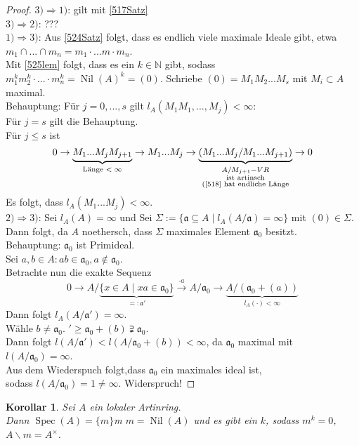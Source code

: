 \documentclass[10pt,a4paper]{article}
\newcommand{\N}{\ensuremath{\mathbb{N}}}
\newcommand{\Spec}{\ensuremath{\operatorname{Spec}}}
\newcommand{\Nil}{\ensuremath{\operatorname{Nil}}}
\newcounter{thm}[section]
\theoremstyle{definition}
\theoremstyle{plain}
\newtheorem{kor}[thm]{Korollar}
\theoremstyle{remark}
\begin{document}
\begin{proof}
	$3)\Rightarrow 1)$: gilt mit \ref{517Satz}\\
	$3)\Rightarrow 2)$: ??? \\%
	$1)\Rightarrow 3)$: Aus \ref{524Satz} folgt, dass es endlich viele maximale Ideale gibt, etwa $m_1\cap...\cap m_n=m_1\cdot...m\cdot m_n$.\\
	Mit \ref{525lem} folgt, dass es ein $k\in\N$ gibt, sodass $m_1^km_2^k\cdot...\cdot m_n^k=\Nil(A)^k=(0)$. Schriebe $(0)=M_1M_2...M_s$ mit $M_i\subset A$ maximal.\\
	Behauptung: Für $j=0,...,s$ gilt $l_A(M_1M_1,...,M_j)<\infty$:\\
	Für $j=s$ gilt die Behauptung.\\
	Für $j\leq s$ ist 
	\[0\rightarrow \underbrace{M_1...M_jM_{j+1}}_{\text{Länge $<\infty$}}
	\rightarrow M_1...M_j
	\rightarrow \underbrace{(M_1...M_j/M_1...M_{j+1})}_{
		\substack{A/M_{j+1}-VR\\
		\text{ist artinsch}\\
		\text{(\ref{518} hat endliche Länge}}}
	\rightarrow 0\]
	Es folgt, dass $l_A(M_1...M_j)<\infty$.\\
	$2)\Rightarrow 3)$: Sei $l_A(A)=\infty$ und Sei $\Sigma:=\{\mathfrak a\subseteq A\mid l_A(A/\mathfrak a)=\infty\}$ mit $(0)\in\Sigma$.\\
	Dann folgt, da $A$ noethersch, dass $\Sigma$ maximales Element $\mathfrak a_0$ besitzt.\\
	Behauptung: $\mathfrak a_0$ ist Primideal.\\
	Sei $a,b\in A:ab\in\mathfrak a_0, a\notin\mathfrak a_0$.\\
	Betrachte nun die exakte Sequenz
	\[0\rightarrow A/\underbrace{\{x\in A\mid xa\in \mathfrak a_0\}}_{=:\mathfrak a'}\xrightarrow{\cdot a}A/\mathfrak a_0\rightarrow \underbrace{A/(\mathfrak a_0+(a))}_{l_A(\cdot)<\infty}\]
Dann folgt $l_A(A/\mathfrak a')=\infty$.\\
Wähle $b\neq \mathfrak a_0$. $\mathfrak '\geq \mathfrak a_0+(b)\supsetneqq \mathfrak a_0$.\\
Dann folgt $l(A/\mathfrak a')<l(A/\mathfrak a_0+(b))<\infty$, da $\mathfrak a_0$ maximal mit $l(A/\mathfrak a_0)=\infty$.\\
Aus dem Wiederspuch folgt,dass $\mathfrak a_0$ ein maximales ideal ist, \\
sodass $l(A/\mathfrak a_0)=1\neq \infty$. Widerspruch!
\end{proof}
\begin{kor}\label{527Kor}
	Sei $A$ ein lokaler Artinring.\\
	Dann $\Spec(A)=\{m\}$m $m=\Nil(A)$ und es gibt ein $k$, sodass $m^k=0$, $A\backslash m=A^\times$.
\end{kor}
\end{document}
